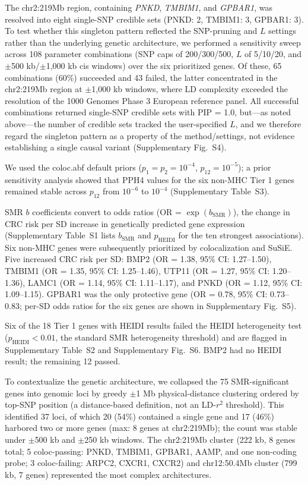 \documentclass[11pt,a4paper]{article}
\begin{document}


The chr2:219Mb region, containing \textit{PNKD}, \textit{TMBIM1}, and
\textit{GPBAR1}, was resolved into eight single-SNP credible sets
(PNKD: 2, TMBIM1: 3, GPBAR1: 3). To test whether this singleton pattern reflected
the SNP-pruning and $L$ settings rather than the underlying genetic architecture,
we performed a sensitivity sweep across 108 parameter combinations (SNP caps of
200/300/500, $L$ of 5/10/20, and $\pm$500 kb/$\pm$1,000 kb cis windows) over the six
prioritized genes. Of these, 65 combinations (60\%) succeeded and 43 failed, the
latter concentrated in the chr2:219Mb region at $\pm$1,000 kb windows, where LD
complexity exceeded the resolution of the 1000 Genomes Phase 3 European reference
panel. All successful combinations returned single-SNP credible sets with
PIP = 1.0, but---as noted above---the number of credible sets tracked the
user-specified $L$, and we therefore regard the singleton pattern as a property of
the method/settings, not evidence establishing a single causal variant (Supplementary Fig.~S4).

We used the coloc.abf default priors ($p_1 = p_2 = 10^{-4}$, $p_{12} = 10^{-5}$);
a prior sensitivity analysis showed that PPH4 values for the six non-MHC Tier 1
genes remained stable across $p_{12}$ from $10^{-6}$ to $10^{-4}$ (Supplementary
Table~S3).

SMR $b$ coefficients convert to odds ratios (OR = $\exp(b_{\text{SMR}})$),
the change in CRC risk per SD increase in genetically predicted gene
expression (Supplementary Table~S1 lists $b_{\text{SMR}}$ and $p_{\text{HEIDI}}$
for the ten strongest associations). Six non-MHC
genes were subsequently prioritized by colocalization and SuSiE. Five increased CRC risk per SD:
BMP2 (OR = 1.38, 95\% CI: 1.27--1.50), TMBIM1
(OR = 1.35, 95\% CI: 1.25--1.46), UTP11
(OR = 1.27, 95\% CI: 1.20--1.36), LAMC1 (OR = 1.14, 95\% CI:
1.11--1.17), and PNKD (OR = 1.12, 95\% CI: 1.09--1.15). GPBAR1
was the only protective gene (OR = 0.78, 95\% CI: 0.73--0.83; per-SD odds
ratios for the six genes are shown in Supplementary Fig.~S5).

Six of the 18 Tier 1 genes with HEIDI results failed the HEIDI heterogeneity
test ($p_{\text{HEIDI}} < 0.01$, the standard SMR heterogeneity threshold) and
are flagged in Supplementary Table~S2 and Supplementary Fig.~S6. BMP2 had no HEIDI result; the remaining 12
passed.

To contextualize the genetic architecture, we collapsed the 75 SMR-significant
genes into genomic loci by greedy $\pm$1 Mb physical-distance clustering ordered
by top-SNP position (a distance-based definition, not an LD-$r^{2}$ threshold).
This identified 37 loci, of which 20 (54\%) contained a single gene and 17 (46\%)
harbored two or more genes (max: 8 genes at chr2:219Mb); the count was stable
under $\pm$500 kb and $\pm$250 kb windows. The chr2:219Mb cluster (222 kb, 8 genes
total; 5 coloc-passing: PNKD, TMBIM1, GPBAR1, AAMP, and one non-coding probe; 3
coloc-failing: ARPC2, CXCR1, CXCR2) and chr12:50.4Mb cluster (799 kb, 7 genes)
represented the most complex architectures.
\end{document}

